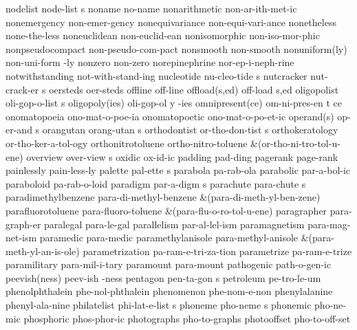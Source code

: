 \5 nodelist		node-list s		%
\1 noname		no-name
\1 nonarithmetic	non-ar-ith-met-ic	%
\1 nonemergency 	non-emer-gency
\1 nonequivariance	non-equi-vari-ance
\1 nonetheless		none-the-less        %
\1 noneuclidean 	non-euclid-ean
\1 nonisomorphic	non-iso-mor-phic
\1 nonpseudocompact	non-pseudo-com-pact
\1 nonsmooth		non-smooth
\2 nonuniform(ly)	non-uni-form -ly
\1 nonzero		non-zero		%
\1 norepinephrine	nor-ep-i-neph-rine
\1 notwithstanding	not-with-stand-ing   %
\5 nucleotide		nu-cleo-tide s		%
\5 nutcracker		nut-crack-er s
\1 oersteds		oer-steds
\1 offline		off-line		%
\2 offload(s,ed)	off-load s,ed		%
\5 oligopolist		oli-gop-o-list s
\3 oligopoly(ies)	oli-gop-ol y -ies
\3 omnipresent(ce)	om-ni-pres-en t ce	%
\1 onomatopoeia		ono-mat-o-poe-ia	%
\1 onomatopoetic	ono-mat-o-po-et-ic	%
\2 operand(s)		op-er-and s
\5 orangutan		orang-utan s
\5 orthodontist 	or-tho-don-tist s
\1 orthokeratology	or-tho-ker-a-tol-ogy
\1 orthonitrotoluene	ortho-nitro-toluene
\tabalign		&\null\quad (or-tho-ni-tro-tol-u-ene)\cr
\5 overview		over-view s
\1 oxidic		ox-id-ic
\1 padding		pad-ding
\NewWordtrue
\1 pagerank		page-rank		%
\1 painlessly		pain-less-ly
\5 palette		pal-ette s		%
\1 parabola		pa-rab-ola
\1 parabolic		par-a-bol-ic
\1 paraboloid		pa-rab-o-loid
\5 paradigm		par-a-digm s
\5 parachute		para-chute s
\1 paradimethylbenzene	para-di-methyl-benzene
\tabalign		&\null\quad (para-di-meth-yl-ben-zene)\cr
\1 parafluorotoluene	para-fluoro-toluene
\tabalign		&\null\quad (para-flu-o-ro-tol-u-ene)\cr
\1 paragrapher		para-graph-er
\1 paralegal		para-le-gal
\1 parallelism		par-al-lel-ism
\1 paramagnetism	para-mag-net-ism
\1 paramedic		para-medic
\1 paramethylanisole	para-methyl-anisole
\tabalign		&\null\quad (para-meth-yl-an-is-ole)\cr
\1 parametrization	pa-ram-e-tri-za-tion	%
\1 parametrize		pa-ram-e-trize
\1 paramilitary 	para-mil-i-tary
\1 paramount		para-mount
\1 pathogenic		path-o-gen-ic
\2 peevish(ness)	peev-ish -ness
\5 pentagon		pen-ta-gon s
\1 petroleum		pe-tro-le-um
\1 phenolphthalein	phe-nol-phthalein	%
\1 phenomenon		phe-nom-e-non
\1 phenylalanine 	phenyl-ala-nine		%
\5 philatelist		phi-lat-e-list s
\5 phoneme		pho-neme s              %
\1 phonemic		pho-ne-mic
\1 phosphoric		phos-phor-ic
\1 photographs		pho-to-graphs        %
\1 photooffset		pho-to-off-set  	%
